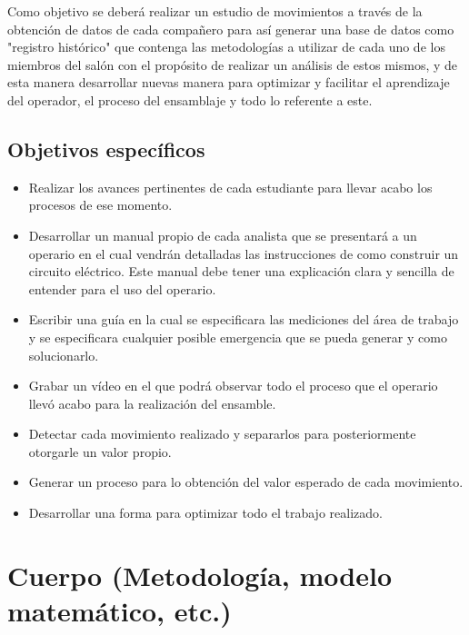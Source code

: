         Como objetivo se deberá realizar un estudio de movimientos a través de la obtención de datos de cada compañero para así generar una base de datos como "registro histórico" que contenga las metodologías a utilizar de cada uno de los miembros del salón con el propósito de realizar un análisis de estos mismos, y de esta manera desarrollar nuevas manera para optimizar y facilitar el aprendizaje del operador, el proceso del ensamblaje y todo lo referente a este.
    
    \subsection{Objetivos específicos }
    
    \begin{itemize}
        \item Realizar los avances pertinentes de cada estudiante para llevar acabo los procesos de ese momento.
        \item Desarrollar un manual propio de cada analista que se presentará a un operario en el cual vendrán detalladas las instrucciones de como construir un circuito eléctrico. Este manual debe tener una explicación clara y sencilla de entender para el uso del operario.
        \item Escribir una guía en la cual se especificara las mediciones del área de trabajo y se especificara cualquier posible emergencia que se pueda generar y como solucionarlo.
        \item Grabar un vídeo en el que podrá observar todo el proceso que el operario llevó acabo para la realización del ensamble.
        \item Detectar cada movimiento realizado y separarlos para posteriormente otorgarle un valor propio.
        \item Generar un proceso para lo obtención del valor esperado de cada movimiento.
        \item Desarrollar una forma para optimizar todo el trabajo realizado.
    \end{itemize}
    
    \section{Cuerpo (Metodología, modelo matemático, etc.)}
    
